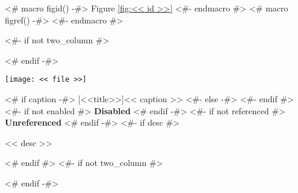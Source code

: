 <# macro figid() -#>
Figure \ref{fig:<< id >>}
<#- endmacro #>
<# macro figref() -#>
\color{light-gray}
<#- endmacro #>

\begin{samepage}
\nopagebreak
<#- if not two_column #>\begin{multicols}{2}<# endif -#>
\noindent\centerline{\texttt{[image: << file >>]}}
<# if caption -#>
\nopagebreak
{}[<<title>>]{<< caption >>}
<#- else -#>
<#- endif #>\label{fig:<< id >>}
<#- if not enabled #>
{\color{red}\textbf{Disabled}}
<# endif -#>
<#- if not referenced #>
{\color{red}\textbf{Unreferenced}}
<# endif -#>
<#- if desc #>
\nopagebreak
\begin{figinfo}<< desc >>\end{figinfo}
<# endif #>
<#- if not two_column #>\end{multicols}<# endif -#>
\end{samepage}
\pagebreak
